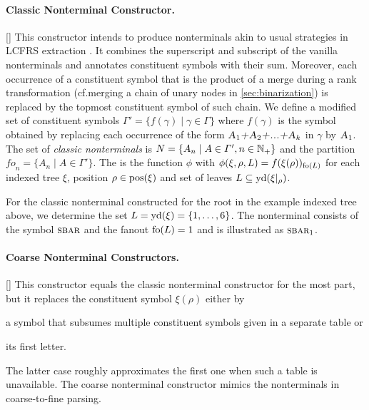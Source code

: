 \documentclass[../../document.tex]{subfiles}
\begin{document}
    \paragraph{Classic Nonterminal Constructor.}[]
    This constructor intends to produce nonterminals akin to usual strategies in LCFRS extraction \cite{MaierSogaard08}.
    It combines the superscript and subscript of the vanilla nonterminals and annotates constituent symbols with their sum.
    Moreover, each occurrence of a constituent symbol that is the product of a merge during a rank transformation (cf.\@ merging a chain of unary nodes in \cref{sec:binarization}) is replaced by the topmost constituent symbol of such chain.
    We define a modified set of constituent symbols \(\varGamma' = \{ f(\gamma) \mid \gamma \in \varGamma \}\) where \(f(\gamma)\) is the symbol obtained by replacing each occurrence of the form \(\textsc{\textsl{A$_1$+A$_2$+...+A$_k$}}\) in \(\gamma\) by \(\textsc{\textsl{A$_1$}}\).
    The set of \emph{classic nonterminals} is \(N = \{ A_n \mid A \in \varGamma', n \in \mathbb{N}_+ \}\) and the partition \(\mathit{fo}_n = \{A_n \mid A \in \varGamma'\}\).
    The  is the function \(\phi\) with \(\phi(\xi, \rho, L) = f(\xi(\rho))_{\operatorname{fo}(L)}\) for each indexed tree \(\xi\), position \(\rho \in \operatorname{pos}(\xi)\) and set of leaves \(L \subseteq \operatorname{yd}(\xi|_\rho)\).

    \begin{example}
    For the classic nonterminal constructed for the root in the example indexed tree above, we determine the set \(L = \operatorname{yd}(\xi) = \{1,\ldots,6\}\).
    The nonterminal consists of the symbol \(\textsc{sbar}\) and the fanout \(\operatorname{fo}(L) = 1\) and is illustrated as \(\textsc{sbar}_1\).
    \end{example}

    \paragraph{Coarse Nonterminal Constructors.}[]
    This constructor equals the classic nonterminal constructor for the most part, but it replaces the constituent symbol \(\xi(\rho)\) either by
    \begin{inparaenum}
        \item a symbol that subsumes multiple constituent symbols given in a separate table or
        \item its first letter.
    \end{inparaenum}
    The latter case roughly approximates the first one when such a table is unavailable.
    The coarse nonterminal constructor mimics the nonterminals in coarse-to-fine parsing. \citep{Cha06,Tei17}
\end{document}
